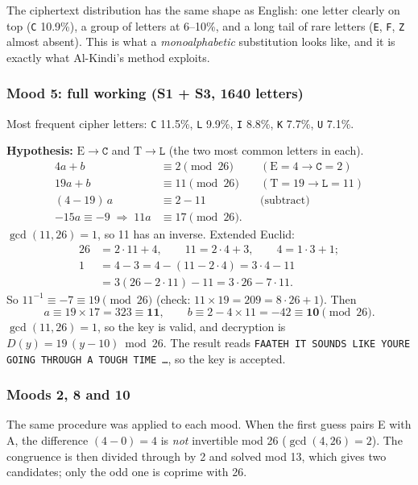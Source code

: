 \documentclass[11pt,a4paper]{article}
\DeclareRobustCommand{\_}{\textunderscore\allowbreak}  %
\newcommand{\ct}[1]{\texttt{#1}}
\begin{document}
The ciphertext distribution has the same shape as English: one letter clearly on top (\ct{C} 10.9\%), a group of
letters at 6--10\%, and a long tail of rare letters (\ct{E}, \ct{F}, \ct{Z} almost absent). This is what a
\emph{monoalphabetic} substitution looks like, and it is exactly what Al-Kindi's method exploits.

\subsubsection*{Mood 5: full working (S1 + S3, 1640 letters)}
Most frequent cipher letters: \ct{C} 11.5\%, \ct{L} 9.9\%, \ct{I} 8.8\%, \ct{K} 7.7\%, \ct{U} 7.1\%.

\textbf{Hypothesis:} $\mathrm{E}\rightarrow\ct{C}$ and $\mathrm{T}\rightarrow\ct{L}$ (the two most common letters in each).
\begin{align*}
4a + b &\equiv 2 \pmod{26} && (\mathrm{E}=4 \rightarrow \ct{C}=2)\\
19a + b &\equiv 11 \pmod{26} && (\mathrm{T}=19 \rightarrow \ct{L}=11)\\
(4-19)\,a &\equiv 2-11 && \text{(subtract)}\\
-15a \equiv -9 \;\Rightarrow\; 11a &\equiv 17 \pmod{26}.
\end{align*}
$\gcd(11,26)=1$, so 11 has an inverse. Extended Euclid:
\begin{align*}
26 &= 2\cdot 11 + 4, \qquad 11 = 2\cdot 4 + 3, \qquad 4 = 1\cdot 3 + 1;\\
1 &= 4 - 3 = 4 - (11 - 2\cdot 4) = 3\cdot 4 - 11\\
  &= 3(26 - 2\cdot 11) - 11 = 3\cdot 26 - 7\cdot 11.
\end{align*}
So $11^{-1} \equiv -7 \equiv 19 \pmod{26}$ (check: $11 \times 19 = 209 = 8\cdot 26 + 1$). Then
\[
a \equiv 19 \times 17 = 323 \equiv \mathbf{11}, \qquad b \equiv 2 - 4\times 11 = -42 \equiv \mathbf{10} \pmod{26}.
\]
$\gcd(11,26)=1$, so the key is valid, and decryption is $D(y) = 19\,(y - 10) \bmod 26$. The result reads
\ct{FAATEH IT SOUNDS LIKE YOURE GOING THROUGH A TOUGH TIME \ldots}, so the key is accepted.

\subsubsection*{Moods 2, 8 and 10}
The same procedure was applied to each mood. When the first guess pairs E with A, the difference $(4-0)=4$ is
\emph{not} invertible mod 26 ($\gcd(4,26)=2$). The congruence is then divided through by 2 and solved mod 13, which
gives two candidates; only the odd one is coprime with 26.
\end{document}
